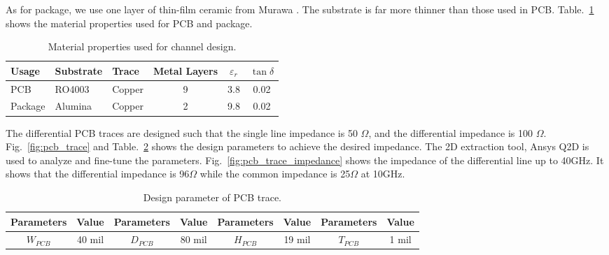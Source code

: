 \documentclass{book}  %
\renewcommand{\subsection}[1]{\psubsection{#1}}
\begin{document}
\begin{paper}
As for package, we use one layer of thin-film ceramic from Murawa \cite{na_alumina_substratess}. The substrate is far more thinner than those used in PCB. Table.~\ref{table:material} shows the material properties used for PCB and package.

\begin{table}[h]
	\renewcommand{\arraystretch}{1.3}
	\begin{center}
		\begin{tabular}{| l | l | l | c | c | c |}
			\hline
			Usage   & Substrate  & Trace & Metal Layers & $\varepsilon_r$ & $\tan\delta$ \\ \hline
			PCB     & RO4003  \cite{na_ro4003_rogers} & Copper & 9 & 3.8 & 0.02  \\ \hline
			Package & Alumina \cite{na_alumina_substratess} & Copper & 2 & 9.8 & 0.02 \\
			\hline
		\end{tabular}
	\end{center}
	\label{table:material}
	\caption{Material properties used for channel design.}
	\vskip0.2in
\end{table}

\subsection{PCB Traces}
\label{subsec:pcb_traces}
The differential PCB traces are designed such that the single line impedance is 50 $\Omega$, and the differential impedance is 100 $\Omega$. Fig.~\ref{fig:pcb_trace} and Table.~\ref{table:pcb_trace} shows the design parameters to achieve the desired impedance. The 2D extraction tool, Ansys Q2D is used to analyze and fine-tune the parameters. Fig.~\ref{fig:pcb_trace_impedance} shows the impedance of the differential line up to 40GHz. It shows that the differential impedance is 96$\Omega$ while the common impedance is 25$\Omega$ at 10GHz. 

\begin{table}[htbp!]
	\renewcommand{\arraystretch}{1.3}	
	\begin{center}
		\begin{tabular}{| c | c | c | c | c | c | c | c |}
			\hline
			Parameters  & Value  & Parameters & Value  & Parameters & Value  & Parameters & Value \\ \hline
			$W_{PCB}$   & 40 mil & $D_{PCB}$  & 80 mil & $H_{PCB}$  & 19 mil & $T_{PCB}$  & 1 mil \\
			\hline
		\end{tabular}
	\end{center}
	\label{table:pcb_trace}
	\caption{Design parameter of PCB trace.}
	\vskip0.2in
\end{table}


\end{paper}
\end{document}

